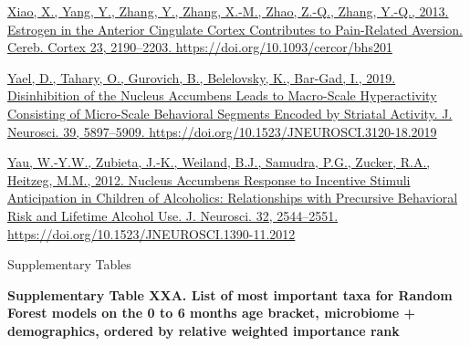 \documentclass[
]{article}
\begin{document}
\href{https://www.zotero.org/google-docs/?uydJ8e}{Xiao, X., Yang, Y.,
Zhang, Y., Zhang, X.-M., Zhao, Z.-Q., Zhang, Y.-Q., 2013. Estrogen in
the Anterior Cingulate Cortex Contributes to Pain-Related Aversion.
Cereb. Cortex 23, 2190--2203. https://doi.org/10.1093/cercor/bhs201}

\href{https://www.zotero.org/google-docs/?uydJ8e}{Yael, D., Tahary, O.,
Gurovich, B., Belelovsky, K., Bar-Gad, I., 2019. Disinhibition of the
Nucleus Accumbens Leads to Macro-Scale Hyperactivity Consisting of
Micro-Scale Behavioral Segments Encoded by Striatal Activity. J.
Neurosci. 39, 5897--5909.
https://doi.org/10.1523/JNEUROSCI.3120-18.2019}

\href{https://www.zotero.org/google-docs/?uydJ8e}{Yau, W.-Y.W., Zubieta,
J.-K., Weiland, B.J., Samudra, P.G., Zucker, R.A., Heitzeg, M.M., 2012.
Nucleus Accumbens Response to Incentive Stimuli Anticipation in Children
of Alcoholics: Relationships with Precursive Behavioral Risk and
Lifetime Alcohol Use. J. Neurosci. 32, 2544--2551.
https://doi.org/10.1523/JNEUROSCI.1390-11.2012}

Supplementary Tables

\textbf{Supplementary Table XXA. List of most important taxa for Random
Forest models on the 0 to 6 months age bracket, microbiome +
demographics, ordered by relative weighted importance rank}
\end{document}
